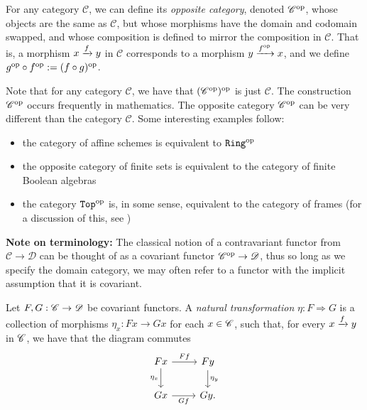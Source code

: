 \documentclass{article}[11pt]
\begin{document}
\begin{definition} For any category $\mathscr{C}$, we can define its \textit{opposite category}, denoted $\mathscr{C}^{\text{op}}$, whose objects are the same as $\mathscr{C}$, but whose morphisms have the domain and codomain swapped, and whose composition is defined to mirror the composition in $\mathscr{C}$. That is, a morphism $x\xrightarrow{f} y$ in $\mathscr{C}$ corresponds to a morphism $y\xrightarrow{f^{\text{op}}} x$, and we define $g^{\text{op}} \circ f^{\text{op}} := (f\circ g)^{\text{op}}$.
\end{definition}

Note that for any category $\mathscr{C}$, we have that $(\mathscr{C}^{\text{op}})^{\text{op}}$ is just $\mathscr{C}$. The construction $\mathscr{C}^{\text{op}}$ occurs frequently in mathematics. The opposite category $\mathscr{C}^{\text{op}}$ can be very different than the category $\mathscr{C}$. Some interesting examples follow:
\vspace{-1em}
\begin{itemize}\itemsep0em 
    \item the category of affine schemes is equivalent to $\texttt{Ring}^{\text{op}}$
     \item the opposite category of finite sets is equivalent to the category of finite Boolean algebras
    \item the category $\texttt{Top}^{\text{op}}$ is, in some sense, equivalent to the category of frames  (for a discussion of this, see \cite{top-op-mathse})
\end{itemize}



{\bf Note on terminology:} The classical notion of a contravariant functor from $\mathscr{C}\to\mathscr{D}$ can be thought of as a covariant functor $\mathscr{C}^{\text{op}} \to \mathscr{D}$, thus so long as we specify the domain category, we may often refer to a functor with the implicit assumption that it is covariant.



\begin{definition} Let $F,G : \mathscr{C} \to \mathscr{D}$ be covariant functors. A \textit{natural transformation} $\eta : F \Rightarrow G$ is a collection of morphisms $\eta_x : Fx \to Gx$ for each $x\in \mathscr{C}$, such that, for every $x\xrightarrow{f} y$ in $\mathscr{C}$, we have that the diagram commutes
\[
	\begin{tikzcd}
	Fx\rar["Ff" above]\dar["\eta_x" left] & Fy\dar["\eta_y" right] \\
	Gx\rar["Gf" below] & Gy.
	\end{tikzcd}
\]
\end{definition}
\end{document}
